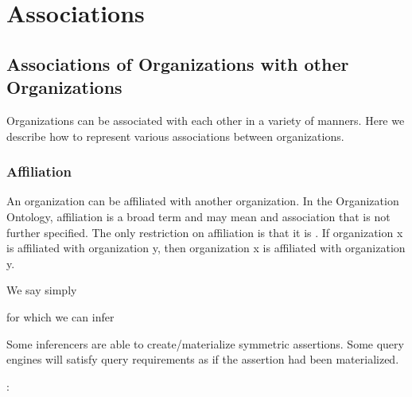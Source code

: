 \documentclass[letterpaper,10pt,english]{sphinxmanual}
\begin{document}
\chapter{Associations}
\label{\detokenize{associations:index-0}}\label{\detokenize{associations:id1}}\label{\detokenize{associations::doc}}

\section{Associations of Organizations with other Organizations}
\label{\detokenize{associations:associations-of-organizations-with-other-organizations}}
\sphinxAtStartPar
Organizations can be associated with each other in a variety of manners.  Here we
describe how to represent various associations between organizations.


\subsection{Affiliation}
\label{\detokenize{associations:affiliation}}
\sphinxAtStartPar
An organization can be affiliated with another organization.  In the Organization
Ontology,
affiliation is a broad term and may mean and association that is not further specified.
The only restriction on affiliation is that it is .  If organization x is
affiliated with organization y, then organization x is affiliated with organization y.

\sphinxAtStartPar
We say simply

\begin{sphinxVerbatim}[commandchars=\\\{\}]
  
  
  
\end{sphinxVerbatim}

\sphinxAtStartPar
for which we can infer \sphinxstepexplicit %
\begin{footnote}[1]\label{\thesphinxscope.1}%
\sphinxAtStartFootnote
Some inferencers are able to create/materialize symmetric assertions.  Some query
engines will satisfy query requirements as if the assertion had been materialized.
%
\end{footnote}:

\begin{sphinxVerbatim}[commandchars=\\\{\}]
  
\end{sphinxVerbatim}
\end{document}
